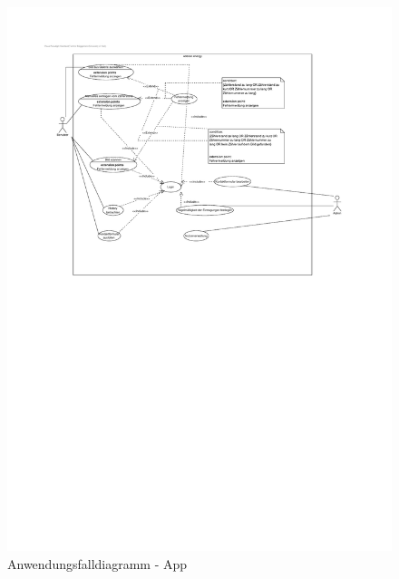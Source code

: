 \begin{figure}[h]
	\centering
	\includegraphics[width=20cm]{./img/mustCase}
	\caption{Anwendungsfalldiagramm - App}
	\label{fig:anwendungsfalldiagramm-app}
\end{figure}

\newpage

